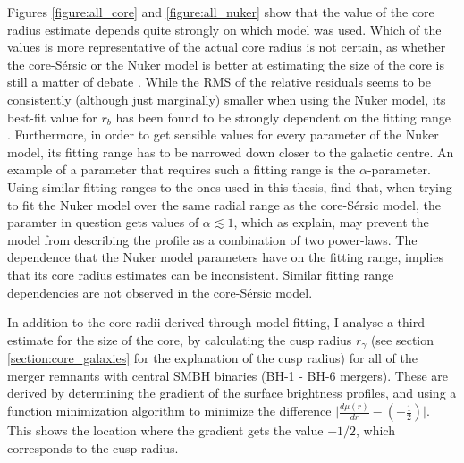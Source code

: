 \documentclass[english, twoside]{HYgradu}
\begin{document}
Figures \ref{figure:all_core} and \ref{figure:all_nuker} show that the value of the core radius estimate depends quite strongly on which model was used. Which of the values is more representative of the actual core radius is not certain, as whether the core-Sérsic or the Nuker model is better at estimating the size of the core is still a matter of debate \citep{Lauer2007, Dullo2012}. While the RMS of the relative residuals seems to be consistently (although just marginally) smaller when using the Nuker model, its best-fit value for $r_b$ has been found to be strongly dependent on the fitting range \citep{Graham2003}. Furthermore, in order to get sensible values for every parameter of the Nuker model, its fitting range has to be narrowed down closer to the galactic centre. An example of a parameter that requires such a fitting range is the $\alpha$-parameter. Using similar fitting ranges to the ones used in this thesis, \cite{Rantala2018} find that, when trying to fit the Nuker model over the same radial range as the core-Sérsic model, the paramter in question gets values of $\alpha \lesssim 1$, which as \cite{Graham2003} explain, may prevent the model from describing the profile as a combination of two power-laws. The dependence that the Nuker model parameters have on the fitting range, implies that its core radius estimates can be inconsistent. Similar fitting range dependencies are not observed in the core-Sérsic model.

In addition to the core radii derived through model fitting, I analyse a third estimate for the size of the core, by calculating the cusp radius $r_\gamma$ (see section \ref{section:core_galaxies} for the explanation of the cusp radius) for all of the merger remnants with central SMBH binaries (BH-1 - BH-6 mergers). These are derived by determining the gradient of the surface brightness profiles, and using a function minimization algorithm \citep{NelderMead} to minimize the difference $\big| \frac{d\mu(r)}{dr} - \left( - \frac{1}{2} \right) \big|$. This shows the location where the gradient gets the value $-1/2$, which corresponds to the cusp radius. 
\end{document}
